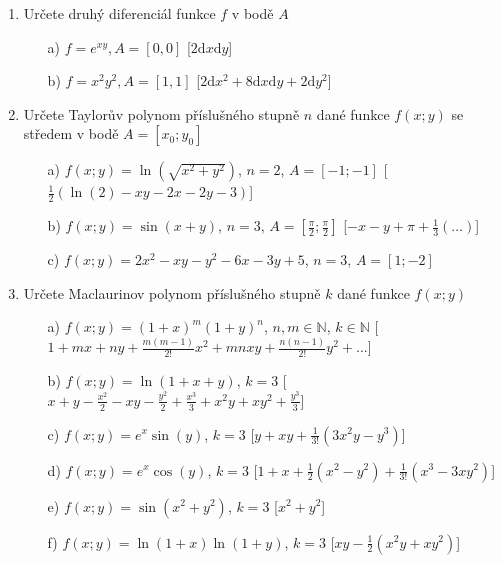 \begin{enumerate}
\item Určete druhý diferenciál funkce $f$ v bodě $A$
\begin{enumerate}
    \item[a)] $f=e^{xy},A=[0,0]$ \hspace{\fill} [$2\mathrm{d}x\mathrm{d}y$]
    \item[b)] $f=x^2y^2,A=[1,1]$ \hspace{\fill} [$2\mathrm{d}x^2+8\mathrm{d}x\mathrm{d}y+2\mathrm{d}y^2$]
\end{enumerate}
                     
\item Určete Taylorův polynom příslušného stupně $n$ dané funkce $f(x;y)$ se středem v bodě $A=[x_0;y_0]$
\begin{enumerate}
\item[a)]{$f(x;y)=\ln(\sqrt{x^2+y^2})$}, $n=2$, $A=[-1;-1]$
\hspace{\fill}[$\frac{1}{2}(\ln(2) -xy-2x-2y-3)$]
\item[b)]{$f(x;y)=\sin(x+y)$}, $n=3$, $A=[\frac{\pi}{2};\frac{\pi}{2}]$
\hspace{\fill}[$-x-y+\pi+\frac{1}{3}(\ldots)$]
\item[c)]{$f(x;y)=2x^2-xy-y^2-6x-3y+5$}, $n=3$, $A=[1;-2]$
\end{enumerate}

                     
\item Určete Maclaurinov polynom příslušného stupně $k$ dané funkce $f(x;y)$
\begin{enumerate}
\item[a)]{$f(x;y)=(1+x)^m(1+y)^n$}, $n,m \in \mathbb{N}$, $k \in \mathbb{N}$
\hspace{\fill}[$1+mx+ny+\frac{m(m-1)}{2!}x^2+mnxy+\frac{n(n-1)}{2!}y^2+...$]
\item[b)]{$f(x;y)=\ln(1+x+y)$}, $k=3$
\hspace{\fill}[$x+y-\frac{x^2}{2}-xy-\frac{y^2}{2}+\frac{x^3}{3}+x^2y+xy^2+\frac{y^3}{3}$]
\item[c)]{$f(x;y)=e^x\sin(y)$}, $k=3$
\hspace{\fill}[$y+xy+\frac{1}{3!}(3x^2y-y^3)$]
\item[d)]{$f(x;y)=e^x\cos(y)$}, $k=3$
\hspace{\fill}[$1+x+\frac{1}{2}(x^2-y^2)+\frac{1}{3!}(x^3-3xy^2)$]
\item[e)]{$f(x;y)=\sin(x^2+y^2)$}, $k=3$
\hspace{\fill}[$x^2+y^2$]
\item[f)]{$f(x;y)=\ln(1+x)\ln(1+y)$}, $k=3$
\hspace{\fill}[$xy-\frac{1}{2}(x^2y+xy^2)$]
\end{enumerate}
\end{enumerate}